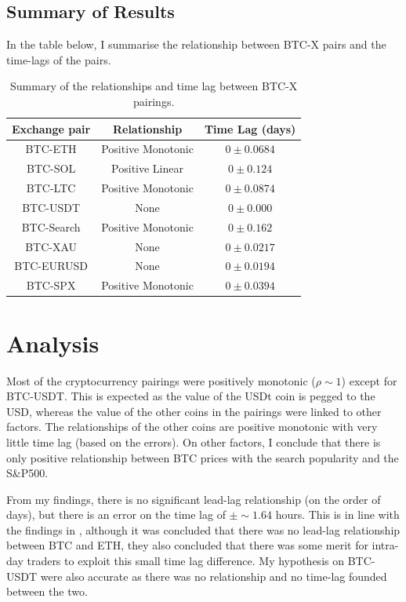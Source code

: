 \documentclass[a4paper, 10pt, conference]{ieeeconf}      %
\begin{document}
\subsection{Summary of Results}
In the table below, I summarise the relationship between BTC-X pairs and the time-lags of the pairs.
\begin{table}[H]
    \centering
        \begin{tabular}{|c|c|c|}
            \hline
             Exchange pair & Relationship & Time Lag (days) \\
             \hline
             \hline
             BTC-ETH & Positive Monotonic & $0\pm0.0684$ \\
             \hline
             BTC-SOL & Positive Linear & $0\pm0.124$ \\
             \hline
             BTC-LTC & Positive Monotonic & $0\pm0.0874$ \\
             \hline
             BTC-USDT & None & $0\pm0.000$ \\
             \hline
             BTC-Search & Positive Monotonic & $0 \pm 0.162$ \\
             \hline
             BTC-XAU & None & $0 \pm 0.0217$ \\
             \hline
             BTC-EURUSD & None & $0 \pm 0.0194$ \\
             \hline
             BTC-SPX & Positive Monotonic & $0 \pm 0.0394$\\
             \hline
        \end{tabular}
    \caption{Summary of the relationships and time lag between BTC-X pairings.}
    \label{summaryvals}
\end{table}

\section{Analysis}
Most of the cryptocurrency pairings were positively monotonic ($\rho\sim1$) except for BTC-USDT. This is expected as the value of the USDt coin is pegged to the USD, whereas the value of the other coins in the pairings were linked to other factors. The relationships of the other coins are positive monotonic with very little time lag (based on the errors). On other factors, I conclude that there is only positive relationship between BTC prices with the search popularity and the S\&P500. 

From my findings, there is no significant lead-lag relationship (on the order of days), but there is an error on the time lag of $\pm\sim1.64$ hours. This is in line with the findings in \cite{Sifat2019}, although it was concluded that there was no lead-lag relationship between BTC and ETH, they also concluded that there was some merit for intra-day traders to exploit this small time lag difference. My hypothesis on BTC-USDT were also accurate as there was no relationship and no time-lag founded between the two.
\end{document}
